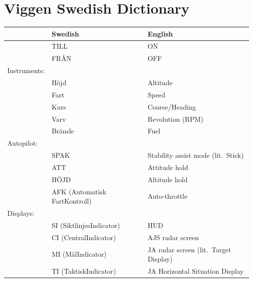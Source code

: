 \documentclass[a4paper]{report}
\begin{document}
\chapter{Viggen Swedish Dictionary}
\begin{tabular}{ll@{\hspace{1em}}l}
  & Swedish & English \\
  \hline
  & TILL & ON \\
  & FRÅN & OFF \\
  Instruments:\\
  & Höjd & Altitude \\
  & Fart & Speed \\
  & Kurs & Course/Heading \\
  & Varv & Revolution (RPM) \\
  & Bränsle & Fuel \\
  Autopilot: \\
  & SPAK & Stability assist mode (lit.\ Stick) \\
  & ATT & Attitude hold \\
  & HÖJD & Altitude hold \\
  & AFK (Automatisk FartKontroll) & Auto-throttle \\
  Displays: \\
  & SI (SiktlinjesIndicator) & HUD \\
  & CI (CentralIndicator) & AJS radar screen \\
  & MI (MålIndicator) & JA radar screen (lit.\ Target Display) \\
  & TI (TaktiskIndicator) & JA Horizontal Situation Display \\
\end{tabular}
\end{document}
